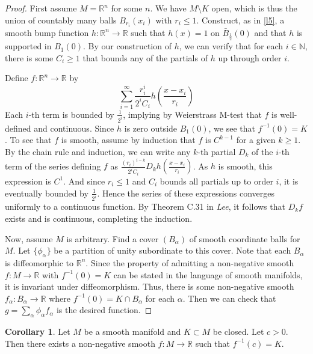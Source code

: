 \documentclass[10pt,letterpaper,cm]{nupset}
\theoremstyle{definition}
\theoremstyle{theorem}
\newtheorem{corollary}[definition]{Corollary}
\theoremstyle{remark}
\newcommand{\N}{\mathbb N}
\newcommand{\R}{\mathbb R}
\newcommand{\1}{\mathbf{1}}
\newcommand{\0}{\vec 0}
\begin{document}
\begin{proof}
First assume $M=\R^n$ for some $n$. We have $M\setminus K$ open, which is thus the union of countably many balls $B_{r_i}(x_i)$ with $r_i \leq 1$. Construct, as in \cref{l5}, a smooth bump function $h: \R^n \to \R$ such that
 $h(x) =1$ on $\bar{B}_{\frac{1}{2}}(0)$ and that $h$ is supported in $B_1(0)$.  By our construction of $h$, we can verify that for each $i\in \N$, there is some $C_i \geq 1$ that bounds any of the partials of $h$ up through order $i$. 
 
\medskip

 Define $f: \R^n \to \R$ by $$\sum_{i=1}^\infty \frac{r_i^i}{2^iC_i}h \left(\frac{x-x_i}{r_i}\right)$$ Each $i$-th term is bounded by $\frac{1}{2^i}$, implying by Weierstrass M-test that $f$ is well-defined and continuous. Since $h$ is zero outside $B_1(0)$, we see that $f^{-1}(0) = K$. To see that $f$ is smooth, assume by induction that $f$ is $C^{k-1}$ for a given $k \geq 1$. By the chain rule and induction, we can write any $k$-th partial $D_k$ of the $i$-th term of the series defining $f$ as $\frac{(r_i)^{i-k}}{2^iC_i} D_kh(\frac{x-x_i}{r_i})$. As $h$ is smooth, this expression is $C^1$. And since $r_i \leq 1$ and $C_i$ bounds all partials up to order $i$, it is eventually bounded by $\frac{1}{2^i}$. Hence the series of these expressions converges uniformly to a continuous function. By Theorem C.31 in \textit{Lee}, it follows that $D_kf$ exists and is continuous, completing the induction. 

\medskip

 Now, assume $M$ is arbitrary. Find a cover $(B_\alpha)$ of smooth coordinate balls for $M$. Let $\{\phi_\alpha\}$ be a partition of unity subordinate to this cover. Note that each $B_\alpha$ is diffeomorphic to $\R^n$. Since the property of admitting a non-negative smooth $f: M \to \R$ with $f^{-1}(0) = K$ can be stated in the language of smooth manifolds, it is invariant under diffeomorphism. Thus, there is some non-negative smooth $f_\alpha : B_\alpha \to \R$ where $f^{-1}(0) = K \cap B_\alpha$ for each $\alpha$. Then we can check that $g = \sum_{\alpha} \phi_\alpha f_\alpha$ is the desired function.
\end{proof}

\begin{corollary}
Let $M$ be a smooth manifold and $K \subset M$ be closed. Let $c >0$. Then there exists a non-negative smooth $f: M \to \R$ such that $f^{-1}(c) =K$.
\end{corollary}
\end{document}
